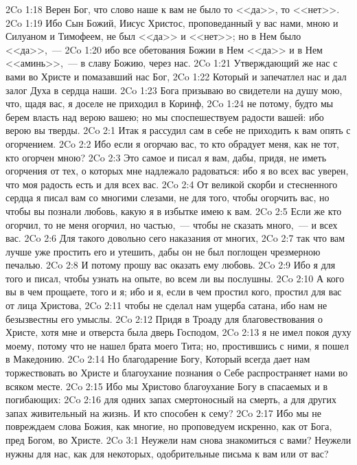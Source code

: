 \vs 2Co 1:18 Верен Бог, что слово наше к вам не было то <<да>>, то <<нет>>.
\vs 2Co 1:19 Ибо Сын Божий, Иисус Христос, проповеданный у вас нами, мною и Силуаном и Тимофеем, не был <<да>> и <<нет>>; но в Нем было <<да>>,~---
\vs 2Co 1:20 ибо все обетования Божии в Нем <<да>> и в Нем <<аминь>>,~--- в славу Божию, через нас.
\vs 2Co 1:21 Утверждающий же нас с вами во Христе и помазавший нас  Бог,
\vs 2Co 1:22 Который и запечатлел нас и дал залог Духа в сердца наши.
\rsbpar\vs 2Co 1:23 Бога призываю во свидетели на душу мою, что, щадя вас, я доселе не приходил в Коринф,
\vs 2Co 1:24 не потому, будто мы берем власть над верою вашею; но мы споспешествуем радости вашей: ибо верою вы тверды.
\vs 2Co 2:1 Итак я рассудил сам в себе не приходить к вам опять с огорчением.
\vs 2Co 2:2 Ибо если я огорчаю вас, то кто обрадует меня, как не тот, кто огорчен мною?
\vs 2Co 2:3 Это самое и писал я вам, дабы, придя, не иметь огорчения от тех, о которых мне надлежало радоваться: ибо я во всех вас уверен, что моя радость есть  и для всех вас.
\vs 2Co 2:4 От великой скорби и стесненного сердца я писал вам со многими слезами, не для того, чтобы огорчить вас, но чтобы вы познали любовь, какую я в избытке имею к вам.
\vs 2Co 2:5 Если же кто огорчил, то не меня огорчил, но частью,~--- чтобы не сказать много,~--- и всех вас.
\vs 2Co 2:6 Для такого довольно сего наказания от многих,
\vs 2Co 2:7 так что вам лучше уже простить его и утешить, дабы он не был поглощен чрезмерною печалью.
\vs 2Co 2:8 И потому прошу вас оказать ему любовь.
\vs 2Co 2:9 Ибо я для того и писал, чтобы узнать на опыте, во всем ли вы послушны.
\vs 2Co 2:10 А кого вы в чем прощаете, того и я; ибо и я, если в чем простил кого, простил для вас от лица Христова,
\vs 2Co 2:11 чтобы не сделал нам ущерба сатана, ибо нам не безызвестны его умыслы.
\rsbpar\vs 2Co 2:12 Придя в Троаду для благовествования о Христе, хотя мне и отверста была дверь Господом,
\vs 2Co 2:13 я не имел покоя духу моему, потому что не нашел  брата моего Тита; но, простившись с ними, я пошел в Македонию.
\vs 2Co 2:14 Но благодарение Богу, Который всегда дает нам торжествовать во Христе и благоухание познания о Себе распространяет нами во всяком месте.
\vs 2Co 2:15 Ибо мы Христово благоухание Богу в спасаемых и в погибающих:
\vs 2Co 2:16 для одних запах смертоносный на смерть, а для других запах живительный на жизнь. И кто способен к сему?
\vs 2Co 2:17 Ибо мы не повреждаем слова Божия, как многие, но проповедуем искренно, как от Бога, пред Богом, во Христе.
\vs 2Co 3:1 Неужели нам снова знакомиться с вами? Неужели нужны для нас, как для некоторых, одобрительные письма к вам или от вас?

